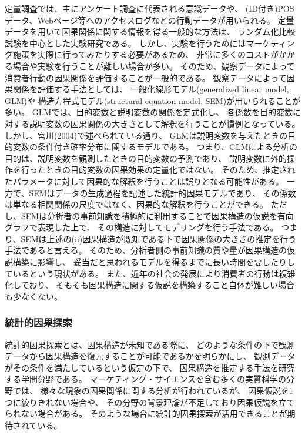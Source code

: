 定量調査では、主にアンケート調査に代表される意識データや、
(ID付き)POSデータ、Webページ等へのアクセスログなどの行動データが用いられる。
定量データを用いて因果関係に関する情報を得る一般的な方法は、
ランダム化比較試験を中心とした実験研究である。
しかし、実験を行うためにはマーケティング施策を実際に行ってみたりする必要があるため、
非常に多くのコストがかかる場合や実験を行うことが難しい場合が多い。
そのため、観察データによって消費者行動の因果関係を評価することが一般的である。
観察データによって因果関係を評価する手法としては、
一般化線形モデル(generalized linear model, GLM)や
構造方程式モデル(structural equation model, SEM)が用いられることが多い\cite{2015-pb}\cite{2009-qw}。
GLMでは、目的変数と説明変数の関係を定式化し、
各係数を目的変数に対する説明変数の因果関係の大きさとして解釈を行うことが慣例となっている。
しかし、宮川(2004)\cite{2004-qj}で述べられている通り、
GLMは説明変数を与えたときの目的変数の条件付き確率分布に関するモデルである。
つまり、GLMによる分析の目的は、説明変数を観測したときの目的変数の予測であり、
説明変数に外的操作を行ったときの目的変数の因果効果の定量化ではない。
そのため、推定されたパラメータに対して因果的な解釈を行うことは誤りとなる可能性がある。
一方で、SEMはデータの生成過程を記述した統計的因果モデルであり、
その係数は単なる相関関係の尺度ではなく、因果的な解釈を行うことができる\cite{2004-qj}。
ただし、SEMは分析者の事前知識を積極的に利用することで因果構造の仮説を有向グラフで表現した上で、
その構造に対してモデリングを行う手法である。
つまり、SEMは上述の(ii)因果構造が既知である下で因果関係の大きさの推定を行う手法であると言える。
そのため、分析者側の事前知識の質や量が因果構造の仮説構築に影響し、
妥当だと思われるモデルを得るまでに長い時間を要したりしているという現状がある。
また、近年の社会の発展により消費者の行動は複雑化しており、
そもそも因果構造に関する仮説を構築すること自体が難しい場合も少なくない。


\subsubsection{統計的因果探索}

統計的因果探索とは、因果構造が未知である際に、
どのような条件の下で観測データから因果構造を復元することが可能であるかを明らかにし、
観測データがその条件を満たしているという仮定の下で、
因果構造を推定する手法を研究する学問分野である。
マーケティング・サイエンスを含む多くの実質科学の分野では、
様々な現象の因果関係に関する分析が行われているが、
因果仮説を1つに絞りきれない場合や、
その分野の背景理論が不足しており因果仮説を立てられない場合がある。
そのような場合に統計的因果探索が活用できることが期待されている\cite{2017-zx}。

